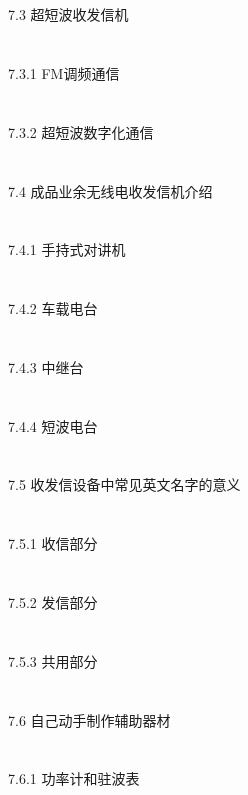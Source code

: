 \documentclass[12pt,UTF8]{ctexbook}
\begin{document}
\section{}7.3 超短波收发信机
\section{}7.3.1 FM调频通信
\section{}7.3.2 超短波数字化通信
\section{}7.4 成品业余无线电收发信机介绍
\section{}7.4.1 手持式对讲机
\section{}7.4.2 车载电台
\section{}7.4.3 中继台
\section{}7.4.4 短波电台
\section{}7.5 收发信设备中常见英文名字的意义
\section{}7.5.1 收信部分
\section{}7.5.2 发信部分
\section{}7.5.3 共用部分
\section{}7.6 自己动手制作辅助器材
\section{}7.6.1 功率计和驻波表
\end{document}
